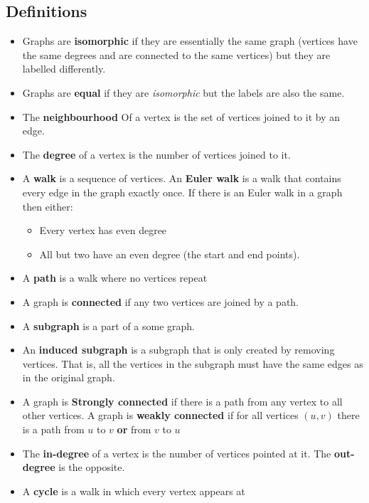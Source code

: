 \documentclass[11pt,fleqn,a4paper,titlepage,dvipsnames,cmyk]{scrartcl}
\begin{document}
\subsection{Definitions}%
\label{sub:Definitions}
\begin{itemize}
    \item Graphs are \textbf{isomorphic} if they are essentially the same
        graph (vertices have the same degrees and are connected to the
        same vertices) but they are labelled differently.
    \item Graphs are \textbf{equal} if they are \textit{isomorphic} but
        the labels are also the same.
    \item The \textbf{neighbourhood} Of
        a vertex is the set of vertices joined to it by an edge.
    \item The \textbf{degree} of a vertex is the number of vertices joined
        to it. 
    \item A \textbf{walk} is a sequence of vertices. An \textbf{Euler
        walk} is a walk that contains every edge in the graph exactly
        once. If there is an Euler walk in a graph then either:
        \begin{itemize}
            \item Every vertex has even degree
            \item All but two have an even degree (the start and end points).
        \end{itemize}
    \item A \textbf{path} is a walk where no vertices repeat
    \item A graph is \textbf{connected} if any two vertices are joined by
        a path.
    \item A \textbf{subgraph} is a part of a some graph.
    \item An \textbf{induced subgraph} is a subgraph that is only created
        by removing vertices. That is, all the vertices in the subgraph
        must have the same edges as in the original graph.
    \item A graph is \textbf{Strongly connected} if there is a path from
        any vertex to all other vertices. A graph is \textbf{weakly
        connected} if for all vertices $(u,v)$ there is a path from $u$ to
        $v$ \textbf{or} from $v$ to $u$
    \item The \textbf{in-degree} of a vertex is the number of vertices
        pointed at it. The \textbf{out-degree} is the opposite.
    \item A \textbf{cycle} is a walk in which every vertex appears at

\end{itemize}
\end{document}
